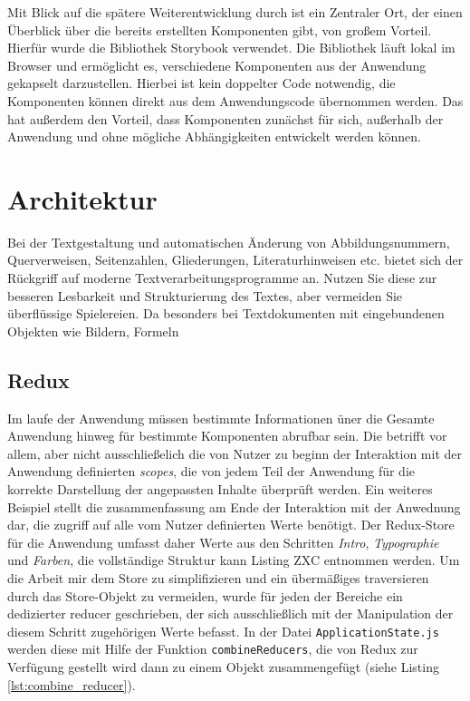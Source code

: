 Mit Blick auf die spätere Weiterentwicklung durch ist ein Zentraler Ort, der einen Überblick über die bereits erstellten Komponenten gibt, von großem Vorteil.
Hierfür wurde die Bibliothek Storybook\footnotemark{} verwendet. Die Bibliothek läuft lokal im Browser und ermöglicht es, verschiedene Komponenten aus der Anwendung gekapselt darzustellen. Hierbei ist kein doppelter Code notwendig, die Komponenten können direkt aus dem Anwendungscode übernommen werden.
Das hat außerdem den Vorteil, dass Komponenten zunächst für sich, außerhalb der Anwendung und ohne mögliche Abhängigkeiten entwickelt werden können.


\section{Architektur}
Bei der Textgestaltung und automatischen Änderung von Abbildungsnummern, Querverweisen,
Seitenzahlen, Gliederungen, Literaturhinweisen etc. bietet sich der Rückgriff
auf moderne Textverarbeitungsprogramme an. Nutzen Sie diese zur besseren Lesbarkeit
und Strukturierung des Textes, aber vermeiden Sie überflüssige Spielereien. Da
besonders bei Textdokumenten mit eingebundenen Objekten wie Bildern, Formeln

\subsection{Redux}
\label{chap:redux}

Im laufe der Anwendung müssen bestimmte Informationen üner die Gesamte Anwendung hinweg für bestimmte Komponenten abrufbar sein. Die betrifft vor allem, aber nicht ausschließelich die von Nutzer zu beginn der Interaktion mit der Anwendung definierten \textit{scopes}, die von jedem Teil der Anwendung für die korrekte Darstellung der angepassten Inhalte überprüft werden. Ein weiteres Beispiel stellt die zusammenfassung am Ende der Interaktion mit der Anwednung dar, die zugriff auf alle vom Nutzer definierten Werte benötigt. Der Redux-Store für die Anwendung umfasst daher Werte aus den Schritten \textit{Intro}, \textit{Typographie} und \textit{Farben}, die vollständige Struktur kann Listing ZXC entnommen werden.
Um die Arbeit mir dem Store zu simplifizieren und ein übermäßiges traversieren durch das Store-Objekt zu vermeiden, wurde für jeden der Bereiche ein dedizierter reducer geschrieben, der sich ausschließlich mit der Manipulation der diesem Schritt zugehörigen Werte befasst. In der Datei \verb|ApplicationState.js| werden diese mit Hilfe der Funktion \verb|combineReducers|, die von Redux zur Verfügung gestellt wird dann zu einem Objekt zusammengefügt (siehe Listing \ref{lst:combine_reducer}).

